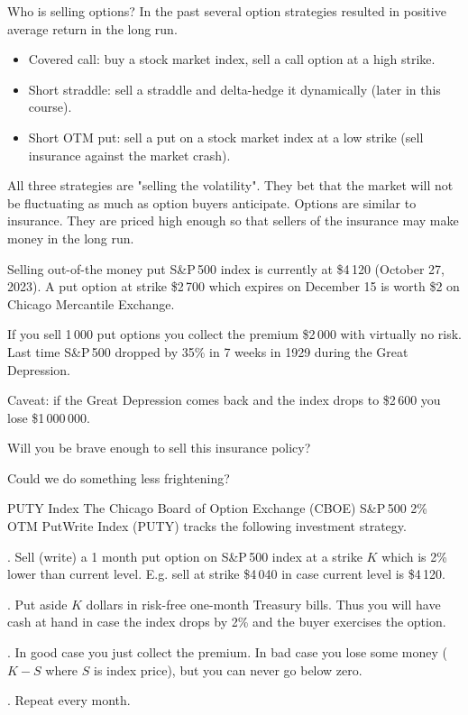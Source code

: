 \documentclass{beamer}
\begin{document}
\begin{frame}{Who is selling options?}
\justify
In the past several option strategies resulted in positive average return in the long run.

\justify
\begin{itemize}
\justifying
\item Covered call: buy a stock market index, sell a call option at a high strike.
\item Short straddle: sell a straddle and delta-hedge it dynamically (later in this course).
\item Short OTM put: sell a put on a stock market index at a low strike (sell insurance against the market crash).
\end{itemize}

\justify
All three strategies are "selling the volatility". They bet that the market will not be fluctuating as much as option buyers anticipate. Options are similar to insurance. They are priced high enough so that sellers of the insurance may make money in the long run.
\end{frame}



\begin{frame}{Selling out-of-the money put}
\justify
S\&P\,500 index is currently at \$4\,120 (October 27, 2023). A put option at strike \$2\,700 which expires on December 15 is worth \$2 on Chicago Mercantile Exchange.

\justify
If you sell 1\,000 put options you collect the premium \$2\,000 with virtually no risk. Last time S\&P\,500 dropped by 35\% in 7 weeks in 1929 during the Great Depression.

\justify
Caveat: if the Great Depression comes back and the index drops to \$2\,600 you lose \$1\,000\,000.

\justify
Will you be brave enough to sell this insurance policy?

\justify
Could we do something less frightening?
\end{frame}



\begin{frame}{PUTY Index}
\justify
The Chicago Board of Option Exchange  (CBOE) S\&P\,500 2\% OTM PutWrite Index (PUTY) tracks the following investment strategy.

. Sell (write) a 1 month put option on S\&P\,500 index at a strike $K$ which is 2\% lower than current level. E.g. sell at strike \$4\,040 in case current level is \$4\,120.

. Put aside $K$ dollars in risk-free one-month Treasury bills. Thus you will have cash at hand in case the index drops by 2\% and the buyer exercises the option.

. In good case you just collect the premium. In bad case you lose some money ($K-S$ where $S$ is index price), but you can never go below zero.

. Repeat every month.
\end{frame}
\end{document}
